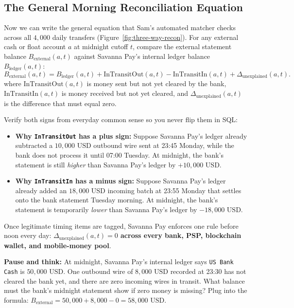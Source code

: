 \subsection{The General Morning Reconciliation Equation}

Now we can write the general equation that Sam's automated matcher checks across all $4{,}000$ daily transfers (Figure~\ref{fig:three-way-recon}). For any external cash or float account $a$ at midnight cutoff $t$, compare the external statement balance $B_{\text{external}}(a, t)$ against Savanna Pay's internal ledger balance $B_{\text{ledger}}(a, t)$:
\[
  B_{\text{external}}(a, t) = B_{\text{ledger}}(a, t) + \text{InTransitOut}(a, t) - \text{InTransitIn}(a, t) + \Delta_{\text{unexplained}}(a, t).
\]
where $\text{InTransitOut}(a, t)$ is money sent but not yet cleared by the bank, $\text{InTransitIn}(a, t)$ is money received but not yet cleared, and $\Delta_{\text{unexplained}}(a, t)$ is the difference that must equal zero.

Verify both signs from everyday common sense so you never flip them in SQL:
\begin{itemize}
  \item \textbf{Why \texttt{InTransitOut} has a plus sign:} Suppose Savanna Pay's ledger already subtracted a $10{,}000\text{ USD}$ outbound wire sent at 23:45 Monday, while the bank does not process it until 07:00 Tuesday. At midnight, the bank's statement is still \emph{higher} than Savanna Pay's ledger by $+10{,}000\text{ USD}$.
  \item \textbf{Why \texttt{InTransitIn} has a minus sign:} Suppose Savanna Pay's ledger already added an $18{,}000\text{ USD}$ incoming batch at 23:55 Monday that settles onto the bank statement Tuesday morning. At midnight, the bank's statement is temporarily \emph{lower} than Savanna Pay's ledger by $-18{,}000\text{ USD}$.
\end{itemize}

Once legitimate timing items are tagged, Savanna Pay enforces one rule before noon every day: \textbf{$\Delta_{\text{unexplained}}(a, t) = 0$ across every bank, PSP, blockchain wallet, and mobile-money pool}.

\begin{recoverybox}
\textbf{Pause and think:} At midnight, Savanna Pay's internal ledger says \texttt{US Bank Cash} is $50{,}000\text{ USD}$. One outbound wire of $8{,}000\text{ USD}$ recorded at 23:30 has not cleared the bank yet, and there are zero incoming wires in transit. What balance must the bank's midnight statement show if zero money is missing? Plug into the formula: $B_{\text{external}} = 50{,}000 + 8{,}000 - 0 = 58{,}000\text{ USD}$.
\end{recoverybox}

